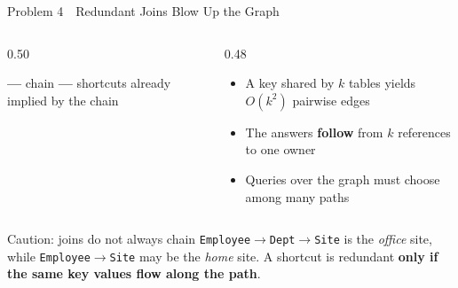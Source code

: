 \documentclass[aspectratio=169]{beamer}
\newcommand{\apptitle}[3]{\textcolor{#1}{#2}~\textcolor{black!30}{\textbar}~#3}
\begin{document}
\begin{frame}{\apptitle{tug}{Problem 4}{Redundant Joins Blow Up the Graph}}
\footnotesize
\begin{columns}[T]
\begin{column}{0.50\textwidth}
\centering
\vspace{2mm}

\vspace{2mm}
{\scriptsize \textcolor{black!70}{\textbf{---}} chain \quad \textcolor{tug}{\textbf{---}} shortcuts already implied by the chain}
\end{column}
\begin{column}{0.48\textwidth}
\vspace{1mm}
\begin{itemize}\setlength\itemsep{5pt}
  \item A key shared by $k$ tables yields $O(k^2)$ pairwise edges
  \item The answers \textbf{follow} from $k$ references to one owner
  \item Queries over the graph must choose among many paths
\end{itemize}
\end{column}
\end{columns}
\vspace{4mm}
\begin{alertblock}{Caution: joins do not always chain}
\vspace{0.5mm}
\texttt{Employee}$\to$\texttt{Dept}$\to$\texttt{Site} is the \emph{office} site, while
\texttt{Employee}$\to$\texttt{Site} may be the \emph{home} site.
A shortcut is redundant \textbf{only if the same key values flow along the path}.
\vspace{0.5mm}
\end{alertblock}
\end{frame}
\end{document}
